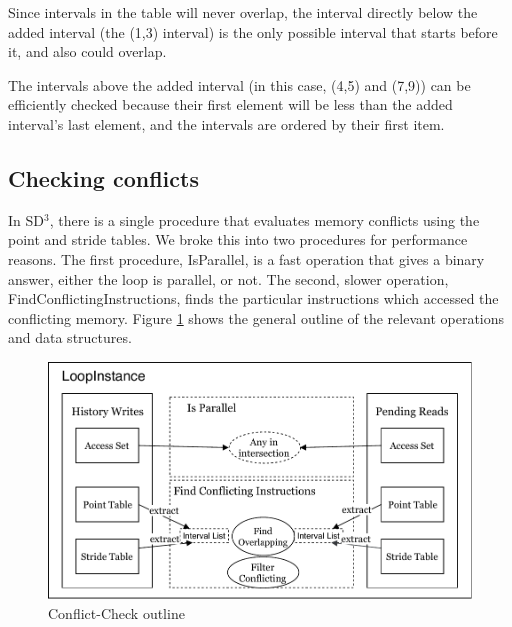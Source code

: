\documentclass[12pt,twoside]{reedthesis}
\begin{document}
			Since intervals in the table will never overlap, the interval directly below the added interval (the (1,3) interval) is the only possible interval that starts before it, and also could overlap.%
			
			The intervals above the added interval (in this case, (4,5) and (7,9)) can be efficiently checked because their first element will be less than the added interval's last element, and the intervals are ordered by their first item. %
			
			
		
		\subsection{Checking conflicts}
			
			In SD$^3$, there is a single procedure that evaluates memory conflicts using the point and stride tables. We broke this into two procedures for performance reasons.  The first procedure, IsParallel, is a fast operation that gives a binary answer, either the loop is parallel, or not. The second, slower operation, FindConflictingInstructions, finds the particular instructions which accessed the conflicting memory. Figure \ref{fig:conflict-check} shows the general outline of the relevant operations and data structures.
			
			\begin{figure}
				\caption{Conflict-Check outline}
				\label{fig:conflict-check}
				\includegraphics[scale=1.0]{conflict-diagram.pdf}
			\end{figure}
		
\end{document}
